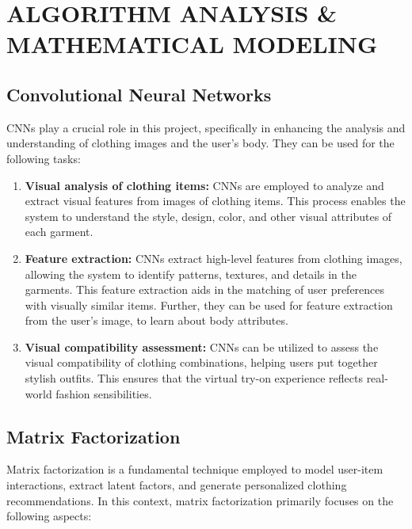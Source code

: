 \chapter[Algorithm Analysis \& Mathematical Modeling]{ALGORITHM ANALYSIS \& MATHEMATICAL MODELING}

\section{Convolutional Neural Networks}
	CNNs play a crucial role in this project, specifically in enhancing the analysis and understanding of clothing images and the user's body. They can be used for the following tasks:

	\begin{enumerate}
		\item \textbf{Visual analysis of clothing items:} CNNs are employed to analyze and extract visual features from images of clothing items. This process enables the system to understand the style, design, color, and other visual attributes of each garment.
		\item \textbf{Feature extraction:} CNNs extract high-level features from clothing images, allowing the system to identify patterns, textures, and details in the garments. This feature extraction aids in the matching of user preferences with visually similar items. Further, they can be used for feature extraction from the user's image, to learn about body attributes.
		\item \textbf{Visual compatibility assessment:} CNNs can be utilized to assess the visual compatibility of clothing combinations, helping users put together stylish outfits. This ensures that the virtual try-on experience reflects real-world fashion sensibilities.
	\end{enumerate}

\section{Matrix Factorization}
	Matrix factorization is a fundamental technique employed to model user-item interactions, extract latent factors, and generate personalized clothing recommendations. In this context, matrix factorization primarily focuses on the following aspects:

